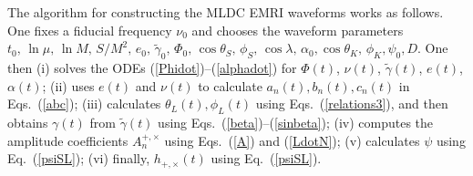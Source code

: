\documentclass[12pt]{iopart}
\begin{document}
The algorithm for constructing the MLDC EMRI waveforms works as follows. One fixes a fiducial frequency $\nu_0$ and chooses the waveform parameters $t_0,\,\ln\mu,\,\ln M,\,S/M^2,\,e_0,\,\tilde\gamma_0,\,\Phi_0,\,\cos\theta_S,\,\phi_S,\,\cos\lambda,\,\alpha_0,\cos\theta_K,\,\phi_K,\psi_0,D$. One then (i) solves the ODEs (\ref{Phidot})--(\ref{alphadot}) for $\Phi(t)$, $\nu(t)$, $\tilde\gamma(t)$, $e(t)$, $\alpha(t)$; (ii) uses $e(t)$ and $\nu(t)$ to calculate $a_n(t), b_n(t), c_n(t)$ in Eqs.~(\ref{abc}); (iii) calculates $\theta_L(t),\phi_L(t)$ using Eqs.~(\ref{relations3}), and then obtains $\gamma(t)$ from $\tilde\gamma(t)$ using Eqs.~(\ref{beta})--(\ref{sinbeta}); (iv) computes the amplitude coefficients $A_n^{+,\times}$  using Eqs.~(\ref{A}) and (\ref{LdotN}); (v) calculates $\psi$ using Eq.~(\ref{psiSL}); (vi) finally,  $h_{+,\times}(t)$ using
Eq.~(\ref{psiSL}).
\end{document}
